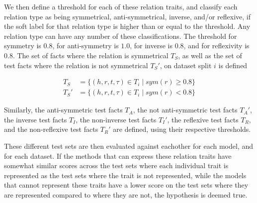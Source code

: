 We then define a threshold for each of these relation traits, and classify each relation type as being symmetrical, anti-symmetrical, inverse, and/or reflexive, if the soft label for that relation type is higher than or equal to the threshold. Any relation type can have any number of these classifications. The threshold for symmetry is $0.8$, for anti-symmetry is $1.0$, for inverse is $0.8$, and for reflexivity is $0.8$. The set of facts where the relation is symmetrical $T_S$, as well as the set of test facts where the relation is not symmetrical $T_S'$, on dataset split $i$ is defined

\begin{equation}
\begin{aligned}
T_S & = \{ (h, r, t, \tau) \in T_i \mid \mathit{sym}(r) \geq 0.8 \}\\
T_S' & = \{ (h, r, t, \tau) \in T_i \mid \mathit{sym}(r) < 0.8 \}
\end{aligned}
\end{equation}

\noindent
Similarly, the anti-symmetric test facts $T_A$, the not anti-symmetric test facts $T_A'$, the inverse test facts $T_I$, the non-inverse test facts $T_I'$, the reflexive test facts $T_R$, and the non-reflexive test facts $T_R'$ are defined, using their respective thresholds.

These different test sets are then evaluated against eachother for each model, and for each dataset. If the methods that can express these relation traits have somewhat similar scores across the test sets where each individual trait is represented as the test sets where the trait is not represented, while the models that cannot represent these traits have a lower score on the test sets where they are represented compared to where they are not, the hypothesis is deemed true.

